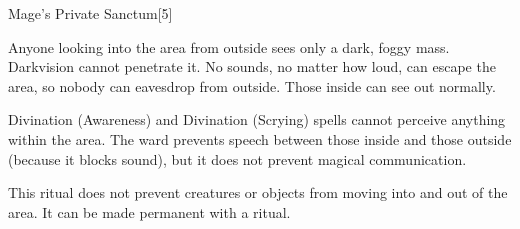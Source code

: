 \begin{spellsection}{Mage's Private Sanctum}[5]
    \begin{spellheader}
    \end{spellheader}
    \begin{spellcontent}
        \begin{spelltargetinginfo}
        \end{spelltargetinginfo}
        \begin{spelleffects}

            \spellline
            \spelleffect Anyone looking into the area from outside sees only a dark, foggy mass. Darkvision cannot penetrate it. No sounds, no matter how loud, can escape the area, so nobody can eavesdrop from outside. Those inside can see out normally.

            Divination (Awareness) and Divination (Scrying) spells cannot perceive anything within the area. The ward prevents speech between those inside and those outside (because it blocks sound), but it does not prevent magical communication.
            \spelldur \durext \dismissable
        \end{spelleffects}
    \end{spellcontent}
    \begin{spellfooter}
        \spellnotes This ritual does not prevent creatures or objects from moving into and out of the area. It can be made permanent with a  ritual.
    \end{spellfooter}
\end{spellsection}


